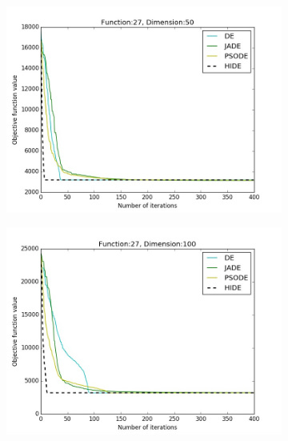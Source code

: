 \documentclass[a4paper,twoside]{article}
\begin{document}
\begin{figure}[h!]
\begin{subfigure}[b]{0.24\textwidth}
        \includegraphics[width=\textwidth,natwidth=800,natheight=600]{plot_50D_F27_save}
        \caption{}
    \end{subfigure}
    \begin{subfigure}[b]{0.24\textwidth}
        \includegraphics[width=\textwidth,natwidth=800,natheight=600]{plot_100D_F27_save}
        \caption{}
    \end{subfigure}


\end{figure}
\end{document}
